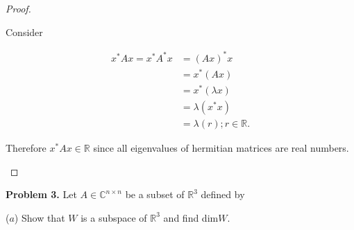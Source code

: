 \documentclass[12pt]{article}
\begin{document}
\begin{proof} 
\begin{flushleft}Consider\end{flushleft}
\begin{align*}
x^{*}Ax = x^{*}A^{*}x &= (Ax)^{*}x \\
				&= x^{*}(Ax) \\
				&= x^{*}(\lambda x) \\
				&= \lambda (x^{*}x) \\ 
				&= \lambda (r) ; r \in \mathbb{R}.
\end{align*}

\begin{flushleft}Therefore $x^{*}Ax \in \mathbb{R}$ since all eigenvalues of hermitian matrices are real numbers.\end{flushleft} 
\end{proof}

\textbf{Problem 3.} Let $A \in \mathbb{C}^{n \times n}$ be a subset of $\mathbb{R}^{3}$ defined by 

\vspace{.2cm}

\begin{flushleft} ($a$) Show that $W$ is a subspace of $\mathbb{R}^{3}$ and find dim$W$. \end{flushleft}

\vspace{.2cm}
\end{document}
